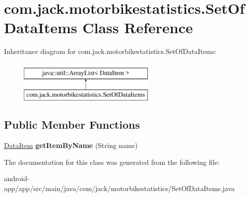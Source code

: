 \hypertarget{classcom_1_1jack_1_1motorbikestatistics_1_1_set_of_data_items}{}\section{com.\+jack.\+motorbikestatistics.\+Set\+Of\+Data\+Items Class Reference}
\label{classcom_1_1jack_1_1motorbikestatistics_1_1_set_of_data_items}
Inheritance diagram for com.\+jack.\+motorbikestatistics.\+Set\+Of\+Data\+Items\+:\begin{figure}[H]
\begin{center}
\leavevmode
\includegraphics[height=2.000000cm]{classcom_1_1jack_1_1motorbikestatistics_1_1_set_of_data_items}
\end{center}
\end{figure}
\subsection*{Public Member Functions}
\begin{DoxyCompactItemize}
\item 
\mbox{\label{classcom_1_1jack_1_1motorbikestatistics_1_1_set_of_data_items_a028fb1f4ce3fd7991d73d368720c19d9}} 
\hyperlink{classcom_1_1jack_1_1motorbikestatistics_1_1_data_item}{Data\+Item} {\bfseries get\+Item\+By\+Name} (String name)
\end{DoxyCompactItemize}


The documentation for this class was generated from the following file\+:\begin{DoxyCompactItemize}
\item 
android-\/app/app/src/main/java/com/jack/motorbikestatistics/Set\+Of\+Data\+Items.\+java\end{DoxyCompactItemize}
